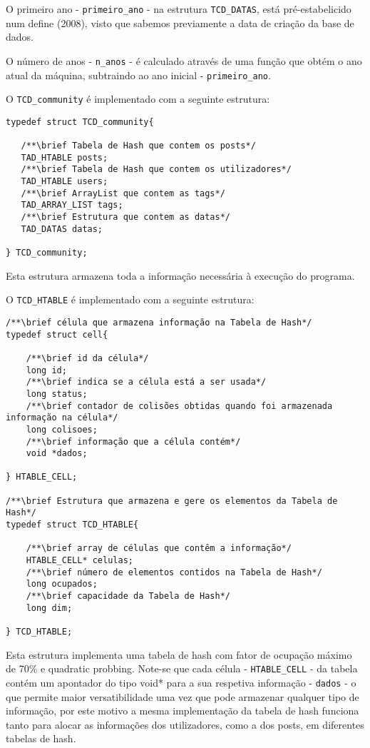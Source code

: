\documentclass[4apaper]{report}
\begin{document}
O primeiro ano - \texttt{primeiro\_ano} - na estrutura \texttt{TCD\_DATAS}, está pré-estabelicido num define (2008), visto que sabemos previamente a data de criação da base de dados.\newline

O número de anos - \texttt{n\_anos} - é calculado através de uma função que obtém o ano atual da máquina, subtraindo ao ano inicial - \texttt{primeiro\_ano}. \newline

O \texttt{TCD\_community} é implementado com a seguinte estrutura:

\begin{verbatim}
typedef struct TCD_community{

   /**\brief Tabela de Hash que contem os posts*/
   TAD_HTABLE posts;  
   /**\brief Tabela de Hash que contem os utilizadores*/
   TAD_HTABLE users;  
   /**\brief ArrayList que contem as tags*/
   TAD_ARRAY_LIST tags;  
   /**\brief Estrutura que contem as datas*/
   TAD_DATAS datas;

} TCD_community;
\end{verbatim}

Esta estrutura armazena toda a informação necessária à execução do programa.\newline

O \texttt{TCD\_HTABLE}  é implementado com a seguinte estrutura:
\begin{verbatim}
/**\brief célula que armazena informação na Tabela de Hash*/
typedef struct cell{

    /**\brief id da célula*/
    long id;
    /**\brief indica se a célula está a ser usada*/
    long status;
    /**\brief contador de colisões obtidas quando foi armazenada informação na célula*/
    long colisoes;
    /**\brief informação que a célula contém*/
    void *dados;

} HTABLE_CELL;

/**\brief Estrutura que armazena e gere os elementos da Tabela de Hash*/
typedef struct TCD_HTABLE{

    /**\brief array de células que contêm a informação*/
    HTABLE_CELL* celulas;
    /**\brief número de elementos contidos na Tabela de Hash*/
    long ocupados;
    /**\brief capacidade da Tabela de Hash*/
    long dim;

} TCD_HTABLE;
\end{verbatim}

Esta estrutura implementa uma tabela de hash com fator de ocupação máximo de 70\% e quadratic probbing. Note-se que cada célula - \texttt{HTABLE\_CELL} - da tabela contém um apontador do tipo void* para a sua respetiva informação - \texttt{dados} - o que permite maior versatibilidade uma vez que pode armazenar qualquer tipo de informação, por este motivo a mesma implementação da tabela de hash funciona tanto para alocar as informações dos utilizadores, como a dos posts, em diferentes tabelas de hash. \newline
\end{document}
